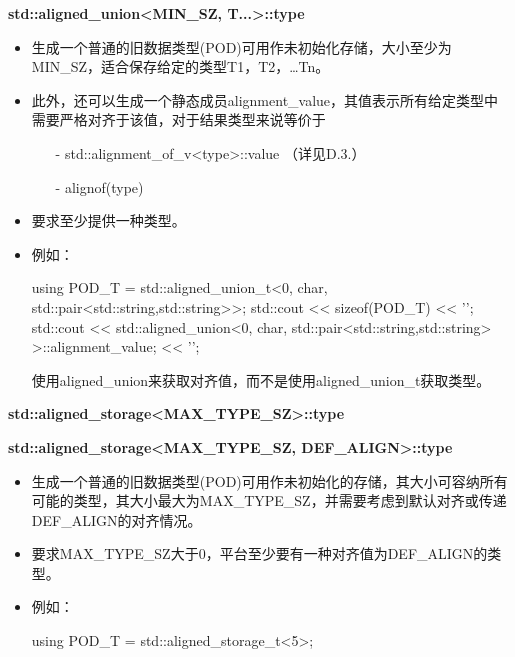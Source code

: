 \textbf{std::aligned\_union<MIN\_SZ, T...>::type}

\begin{itemize}
\item
生成一个普通的旧数据类型(POD)可用作未初始化存储，大小至少为MIN\_SZ，适合保存给定的类型T1，T2，…Tn。

\item
此外，还可以生成一个静态成员alignment\_value，其值表示所有给定类型中需要严格对齐于该值，对于结果类型来说等价于

\begin{itemize}
\item[-]
std::alignment\_of\_v<type>::value （详见D.3.）

\item[-]
alignof(type)
\end{itemize}

\item
要求至少提供一种类型。

\item
例如：
\begin{cpp}
using POD_T = std::aligned_union_t<0, char,
								std::pair<std::string,std::string>>;
std::cout << sizeof(POD_T) << '\n';
std::cout << std::aligned_union<0, char,
								std::pair<std::string,std::string>
								>::alignment_value;
		<< '\n';
\end{cpp}

使用aligned\_union来获取对齐值，而不是使用aligned\_union\_t获取类型。
\end{itemize}

\textbf{std::aligned\_storage<MAX\_TYPE\_SZ>::type}

\textbf{std::aligned\_storage<MAX\_TYPE\_SZ, DEF\_ALIGN>::type}

\begin{itemize}
\item
生成一个普通的旧数据类型(POD)可用作未初始化的存储，其大小可容纳所有可能的类型，其大小最大为MAX\_TYPE\_SZ，并需要考虑到默认对齐或传递DEF\_ALIGN的对齐情况。

\item
要求MAX\_TYPE\_SZ大于0，平台至少要有一种对齐值为DEF\_ALIGN的类型。

\item
例如：
\begin{cpp}
using POD_T = std::aligned_storage_t<5>;
\end{cpp}
\end{itemize}













